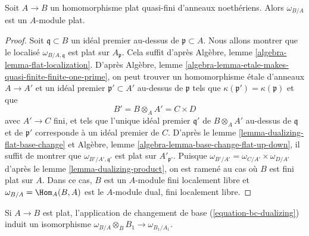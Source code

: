 \begin{lemma}
\label{lemma-dualizing-base-flat-flat}
Soit $A \to B$ un homomorphisme plat quasi-fini d'anneaux noethériens.
Alors $\omega_{B/A}$ est un $A$-module plat.
\end{lemma}

\begin{proof}
Soit $\mathfrak q \subset B$ un idéal premier au-dessus de $\mathfrak p \subset A$.
Nous allons montrer que le localisé $\omega_{B/A, \mathfrak q}$ est plat
sur $A_\mathfrak p$.
Cela suffit d'après Algèbre, lemme \ref{algebra-lemma-flat-localization}.
D'après
Algèbre, lemme \ref{algebra-lemma-etale-makes-quasi-finite-finite-one-prime},
on peut trouver un homomorphisme étale d'anneaux $A \to A'$ et un idéal
premier $\mathfrak p' \subset A'$ au-dessus de $\mathfrak p$
tels que $\kappa(\mathfrak p') = \kappa(\mathfrak p)$ et
que
$$
B' = B \otimes_A A' = C \times D
$$
avec $A' \to C$ fini, et tels que l'unique idéal premier $\mathfrak q'$
de $B \otimes_A A'$ au-dessus de $\mathfrak q$ et de $\mathfrak p'$
corresponde à un idéal premier de $C$. D'après le
lemme \ref{lemma-dualizing-flat-base-change}
et Algèbre, lemme \ref{algebra-lemma-base-change-flat-up-down},
il suffit de montrer que $\omega_{B'/A', \mathfrak q'}$
est plat sur $A'_{\mathfrak p'}$.
Puisque $\omega_{B'/A'} = \omega_{C/A'} \times \omega_{D/A'}$
d'après le lemme \ref{lemma-dualizing-product},
on est ramené au cas où $B$ est fini plat sur $A$.
Dans ce cas, $B$ est un $A$-module fini localement libre
et $\omega_{B/A} = \Hom_A(B, A)$ est le $A$-module dual,
fini localement libre.
\end{proof}

\begin{lemma}
\label{lemma-dualizing-base-change-of-flat}
Si $A \to B$ est plat, l'application de changement de base (\ref{equation-bc-dualizing})
induit un isomorphisme $\omega_{B/A} \otimes_B B_1 \to \omega_{B_1/A_1}$.
\end{lemma}

